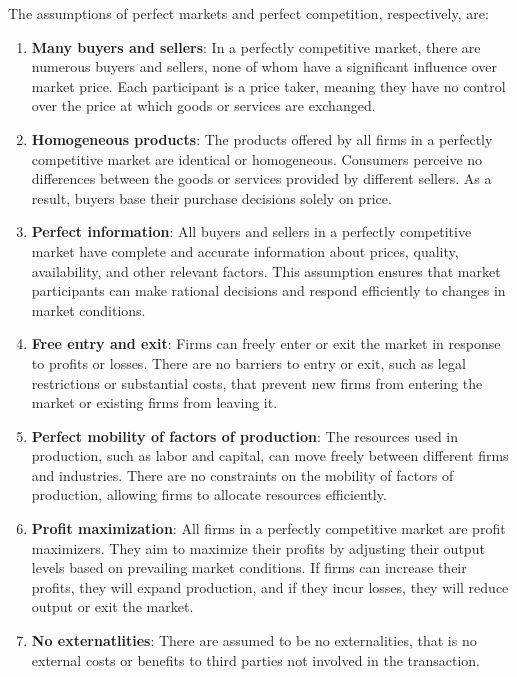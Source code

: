 \documentclass[
  12pt,
  oneside]{book}
\theoremstyle{definition}
\theoremstyle{definition}
\theoremstyle{definition}
\theoremstyle{definition}
\theoremstyle{remark}
\begin{document}
The assumptions of perfect markets and perfect competition, respectively, are:

\begin{enumerate}
\def\labelenumi{\arabic{enumi}.}
\item
  \textbf{Many buyers and sellers}: In a perfectly competitive market, there are numerous buyers and sellers, none of whom have a significant influence over market price. Each participant is a price taker, meaning they have no control over the price at which goods or services are exchanged.
\item
  \textbf{Homogeneous products}: The products offered by all firms in a perfectly competitive market are identical or homogeneous. Consumers perceive no differences between the goods or services provided by different sellers. As a result, buyers base their purchase decisions solely on price.
\item
  \textbf{Perfect information}: All buyers and sellers in a perfectly competitive market have complete and accurate information about prices, quality, availability, and other relevant factors. This assumption ensures that market participants can make rational decisions and respond efficiently to changes in market conditions.
\item
  \textbf{Free entry and exit}: Firms can freely enter or exit the market in response to profits or losses. There are no barriers to entry or exit, such as legal restrictions or substantial costs, that prevent new firms from entering the market or existing firms from leaving it.
\item
  \textbf{Perfect mobility of factors of production}: The resources used in production, such as labor and capital, can move freely between different firms and industries. There are no constraints on the mobility of factors of production, allowing firms to allocate resources efficiently.
\item
  \textbf{Profit maximization}: All firms in a perfectly competitive market are profit maximizers. They aim to maximize their profits by adjusting their output levels based on prevailing market conditions. If firms can increase their profits, they will expand production, and if they incur losses, they will reduce output or exit the market.
\item
  \textbf{No externatlities}: There are assumed to be no externalities, that is no external costs or benefits to third parties not involved in the transaction.
\end{enumerate}
\end{document}
